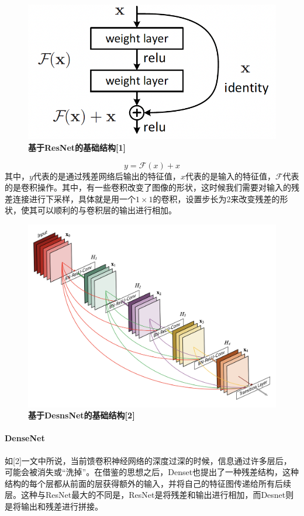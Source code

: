 \documentclass{article}
\begin{document}
\begin{figure}[H]
  \centering
  \includegraphics[scale = 0.4]{Resnet} 
  \caption{\textbf{基于ResNet的基础结构[1]}}
\end{figure}

$$
y = \mathcal{F} (x)+ x
$$
其中，$y$代表的是通过残差网络后输出的特征值，$x$代表的是输入的特征值，$\mathcal{F} $代表的是卷积操作。其中，有一些卷积改变了图像的形状，这时候我们需要对输入的残差连接进行下采样，具体就是用一个$1\times 1$的卷积，设置步长为2来改变残差的形状，使其可以顺利的与卷积层的输出进行相加。

\begin{figure}[H]
  \centering
  \includegraphics[scale = 0.4]{22} 
  \caption{\textbf{基于DesnsNet的基础结构[2]}}
\end{figure}

\paragraph*{DenseNet} 如[2]一文中所说，当前馈卷积神经网络的深度过深的时候，信息通过许多层后，可能会被消失或“洗掉”。在借鉴的思想之后，Denset也提出了一种残差结构，这种结构的每个层都从前面的层获得额外的输入，并将自己的特征图传递给所有后续层。这种与ResNet最大的不同是，ResNet是将残差和输出进行相加，而Desnet则是将输出和残差进行拼接。
\end{document}
